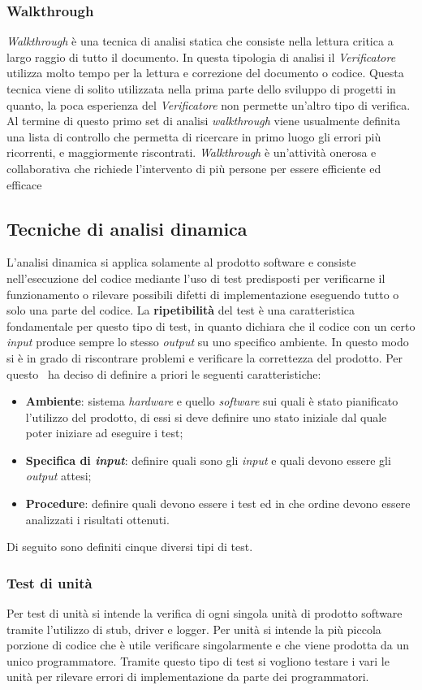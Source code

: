 \subsubsection{Walkthrough}
\textit{Walkthrough} è una tecnica di analisi statica che consiste nella lettura critica a largo raggio di tutto il documento. In questa tipologia di analisi il \textit{Verificatore} utilizza molto tempo per la lettura e correzione del documento o codice. Questa tecnica viene di solito utilizzata nella prima parte dello sviluppo di progetti in quanto, la poca esperienza del \textit{Verificatore} non permette un'altro tipo di verifica. Al termine di questo primo set di analisi \textit{walkthrough} viene usualmente definita una lista di controllo che permetta di ricercare in primo luogo gli errori più ricorrenti, e maggiormente riscontrati. \textit{Walkthrough} è un'attività onerosa e collaborativa che richiede l'intervento di più persone per essere efficiente ed efficace
\subsection{Tecniche di analisi dinamica}
L'analisi dinamica si applica solamente al prodotto software e consiste nell'esecuzione del codice mediante l'uso di test predisposti per verificarne il funzionamento o rilevare possibili difetti di implementazione eseguendo tutto o solo una parte del codice.
La \textbf{ripetibilità} del test è una caratteristica fondamentale per questo tipo di test, in quanto dichiara che il codice con un certo \textit{input} produce sempre lo stesso \textit{output} su uno specifico ambiente. In questo modo si è in grado di riscontrare problemi e verificare la correttezza del prodotto.
Per questo \gruppo ~ha deciso di definire a priori le seguenti caratteristiche:
\begin{itemize}
\item \textbf{Ambiente}: sistema \textit{hardware} e quello \textit{software} sui quali è stato pianificato l'utilizzo del prodotto, di essi si deve definire uno stato iniziale dal quale poter iniziare ad eseguire i test;
\item \textbf{Specifica di \textit{input}}: definire quali sono gli \textit{input} e quali devono essere gli \textit{output} attesi;
\item \textbf{Procedure}: definire quali devono essere i test ed in che ordine devono essere analizzati i risultati ottenuti.
\end{itemize}
Di seguito sono definiti cinque diversi tipi di test.
\subsubsection{Test di unità} 
Per test di unità si intende la verifica di ogni singola unità di prodotto software tramite l'utilizzo di stub, driver e logger. Per unità si intende la più piccola porzione di codice che è utile verificare singolarmente e che viene prodotta da un unico programmatore. Tramite questo tipo di test si vogliono testare i vari le unità per rilevare errori di implementazione da parte dei programmatori.
